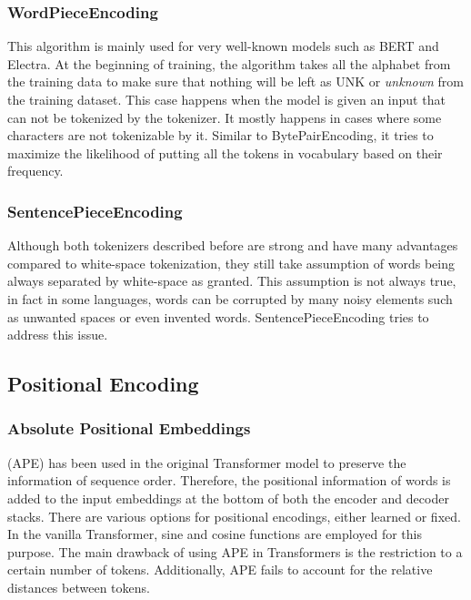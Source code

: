 \documentclass[conference]{IEEEtran}
\begin{document}
\subsubsection{\textbf{WordPieceEncoding}}
This algorithm is mainly used for very well-known models such as BERT and Electra. At the beginning of training, the algorithm takes all the alphabet from the training data to make sure that nothing will be left as UNK or \textit{unknown} from the training dataset. This case happens when the model is given an input that can not be tokenized by the tokenizer. It mostly happens in cases where some characters are not tokenizable by it. Similar to BytePairEncoding, it tries to maximize the likelihood of putting all the tokens in vocabulary based on their frequency.

\subsubsection{\textbf{SentencePieceEncoding}}
Although both tokenizers described before are strong and have many advantages compared to white-space tokenization, they still take assumption of words being always separated by white-space as granted. This assumption is not always true, in fact in some languages, words can be corrupted by many noisy elements such as unwanted spaces or even invented words. SentencePieceEncoding tries to address this issue.


\subsection{\textbf{Positional Encoding}}

\subsubsection{\textbf{Absolute Positional Embeddings}} (APE) \cite{vaswani2017attention} has been used in the original Transformer model to preserve the information of sequence order. Therefore, the positional information of words is added to the input embeddings at the bottom of both the encoder and decoder stacks. There are various options for positional encodings, either learned or fixed. In the vanilla Transformer, sine and cosine functions are employed for this purpose. The main drawback of using APE in Transformers is the restriction to a certain number of tokens. Additionally,  APE fails to account for the relative distances between tokens.
\end{document}
